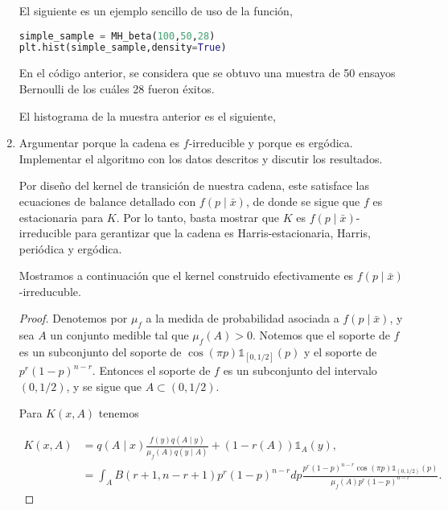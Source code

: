 \documentclass{article}
\begin{document}
\begin{enumerate}
    El siguiente es un ejemplo sencillo de uso de la función,

\begin{lstlisting}[language=Python]
simple_sample = MH_beta(100,50,28)
plt.hist(simple_sample,density=True)\end{lstlisting}

    En el código anterior, se considera que se obtuvo una muestra de 50 ensayos Bernoulli
    de los cuáles 28 fueron éxitos.

    El histograma de la muestra anterior es el siguiente,

    \begin{center}
    \end{center}

    \item Argumentar porque la cadena es $f$-irreducible y porque es ergódica. 
    Implementar el algoritmo con los datos descritos y discutir los resultados.

    Por diseño del kernel de transición de nuestra cadena, este satisface las ecuaciones
    de balance detallado con $f(p\mid \bar x)$, de donde se sigue que $f$ es estacionaria
    para $K$. Por lo tanto, basta mostrar que $K$ es $f(p\mid \bar x)$-irreducible para
    gerantizar que la cadena es Harris-estacionaria, Harris, periódica y ergódica.

    Mostramos a continuación que el kernel construido efectivamente es $f(p\mid \bar x)$-irreducuble.

    \begin{proof}
        Denotemos por $\mu_f$ a la medida de probabilidad asociada a $f(p\mid \bar x)$, y sea
        $A$ un conjunto medible tal que $\mu_f(A)>0$. Notemos que el soporte de $f$ es un subconjunto
        del soporte de $\cos(\pi p)\mathds 1_{[0,1/2]}(p)$ y el soporte de $p^r(1-p)^{n-r}$. 
        Entonces el soporte de $f$ es un subconjunto del intervalo $(0,1/2)$, y se sigue que $A \subset (0,1/2)$.

        Para $K(x,A)$ tenemos

        \begin{align*}
            K(x,A) &= q(A\mid x) \frac{ f(y) q(A \mid y) }{\mu_f(A) q(y\mid A)} + (1 - r(A))\mathds 1_{A}(y),\\
            &= \int_A B(r+1,n-r+1) p^r(1-p)^{n-r} dp \frac{p^r(1-p)^{n-r} \cos (\pi p) \mathds 1_{(0,1/2)} (p) }
            {\mu_f(A) p^r(1-p)^{n-r}}.
        \end{align*}


\end{proof}
\end{enumerate}
\end{document}
